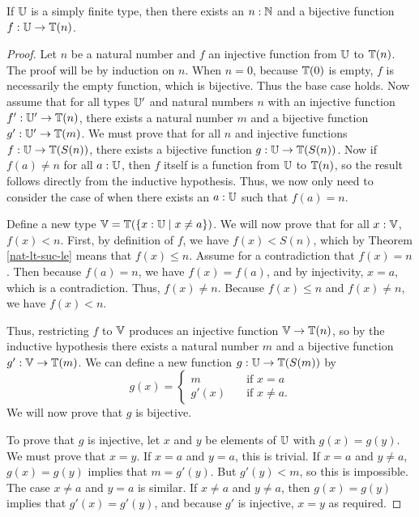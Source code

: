 \documentclass[../math.tex]{subfiles}
\begin{document}
\begin{theorem} \label{simple-finite-bij}
    If $\mathbb{U}$ is a simply finite type, then there exists an $n : \mathbb{N}$ and a
    bijective function $f : \mathbb{U} \to \mathbb{T}(n)$.
\end{theorem}
\begin{proof}
    Let $n$ be a natural number and $f$ an injective function from $\mathbb{U}$ to
    $\mathbb{T}(n)$.  The proof will be by induction on $n$.  When $n = 0$, because
    $\mathbb{T}(0)$ is empty, $f$ is necessarily the empty function, which is bijective.
    Thus the base case holds.  Now assume that for all types $\mathbb{U}'$ and natural
    numbers $n$ with an injective function $f' : \mathbb{U}' \to \mathbb{T}(n)$, there exists a
    natural number $m$ and a bijective function $g' : \mathbb{U}' \to \mathbb{T}(m)$.  We must
    prove that for all $n$ and injective functions $f : \mathbb{U} \to \mathbb{T}(S(n))$, there
    exists a bijective function $g : \mathbb{U} \to \mathbb{T}(S(n))$.  Now if $f(a) \neq n$ for
    all $a : \mathbb{U}$, then $f$ itself is a function from $\mathbb{U}$ to $\mathbb{T}(n)$, so the
    result follows directly from the inductive hypothesis.  Thus, we now only
    need to consider the case of when there exists an $a : \mathbb{U}$ such that $f(a) =
    n$.

    Define a new type $\mathbb{V} = \mathbb{T}(\{x : \mathbb{U} \mid x \neq a\})$.  We will now prove
    that for all $x : \mathbb{V}$, $f(x) < n$.  First, by definition of $f$, we have
    $f(x) < S(n)$, which by Theorem \ref{nat-lt-suc-le} means that $f(x) \leq
    n$.  Assume for a contradiction that $f(x) = n$.  Then because $f(a) = n$,
    we have $f(x) = f(a)$, and by injectivity, $x = a$, which is a
    contradiction.  Thus, $f(x) \neq n$.  Because $f(x) \leq n$ and $f(x) \neq
    n$, we have $f(x) < n$.

    Thus, restricting $f$ to $\mathbb{V}$ produces an injective function $\mathbb{V} \to \mathbb{T}(n)$,
    so by the inductive hypothesis there exists a natural number $m$ and a
    bijective function $g' : \mathbb{V} \to \mathbb{T}(m)$.  We can define a new function $g :
    \mathbb{U} \to \mathbb{T}(S(m))$ by
    \[
        g(x) = \begin{cases}
            m \quad &\text{if $x = a$} \\
            g'(x) \quad &\text{if $x \neq a$.}
        \end{cases}
    \]
    We will now prove that $g$ is bijective.

    To prove that $g$ is injective, let $x$ and $y$ be elements of $\mathbb{U}$ with
    $g(x) = g(y)$.  We must prove that $x = y$.  If $x = a$ and $y = a$, this is
    trivial.  If $x = a$ and $y \neq a$, $g(x) = g(y)$ implies that $m = g'(y)$.
    But $g'(y) < m$, so this is impossible.  The case $x \neq a$ and $y = a$ is
    similar.  If $x \neq a$  and $y \neq a$, then $g(x) = g(y)$ implies that
    $g'(x) = g'(y)$, and because $g'$ is injective, $x = y$ as required.


\end{proof}
\end{document}
